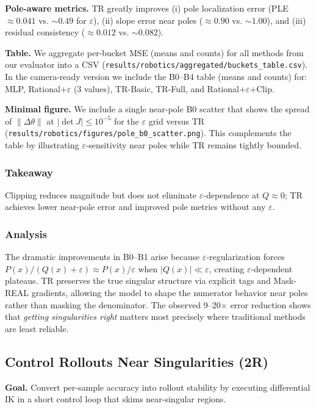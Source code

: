 \documentclass[11pt,twoside]{article}
\begin{document}
\textbf{Pole-aware metrics.} TR greatly improves (i) pole localization error (PLE $\approx 0.041$ vs. $\sim 0.49$ for $\varepsilon$), (ii) slope error near poles ($\approx 0.90$ vs. $\sim 1.00$), and (iii) residual consistency ($\approx 0.012$ vs. $\sim 0.082$).

\textbf{Table.} We aggregate per-bucket MSE (means and counts) for all methods from our evaluator into a CSV (\verb|results/robotics/aggregated/buckets_table.csv|). In the camera-ready version we include the B0--B4 table (means and counts) for: MLP, Rational+$\varepsilon$ (3 values), TR-Basic, TR-Full, and Rational+$\varepsilon$+Clip.

\textbf{Minimal figure.} We include a single near-pole B0 scatter that shows the spread of $\|\Delta\theta\|$ at $|\det J|\le 10^{-5}$ for the $\varepsilon$ grid versus TR (\verb|results/robotics/figures/pole_b0_scatter.png|). This complements the table by illustrating $\varepsilon$-sensitivity near poles while TR remains tightly bounded.

\subsubsection{Takeaway}

Clipping reduces magnitude but does not eliminate $\varepsilon$-dependence at $Q\approx 0$; TR achieves lower near-pole error and improved pole metrics without any $\varepsilon$.
\subsubsection{Analysis}

The dramatic improvements in B0--B1 arise because $\varepsilon$-regularization forces $P(x)/(Q(x)+\varepsilon) \approx P(x)/\varepsilon$ when $|Q(x)| \ll \varepsilon$, creating $\varepsilon$-dependent plateaus. TR preserves the true singular structure via explicit tags and Mask-REAL gradients, allowing the model to shape the numerator behavior near poles rather than masking the denominator. The observed 9--20$\times$ error reduction shows that \emph{getting singularities right} matters most precisely where traditional methods are least reliable.

\subsection{Control Rollouts Near Singularities (2R)}
\textbf{Goal.} Convert per-sample accuracy into rollout stability by executing differential IK in a short control loop that skims near-singular regions.
\end{document}
